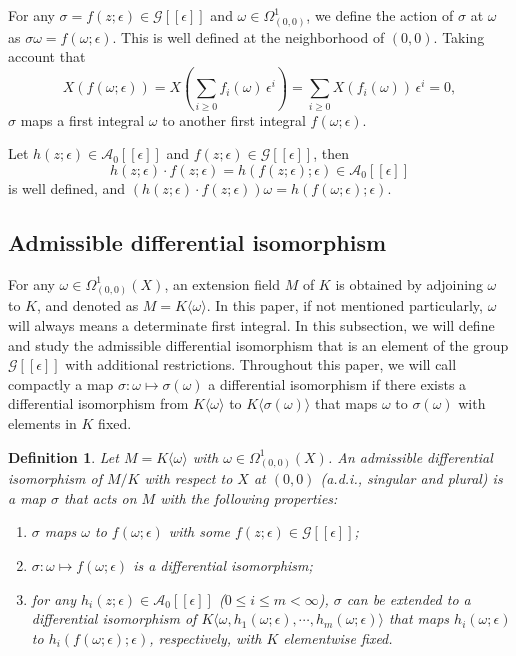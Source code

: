 \documentclass[preprint, 12pt]{elsarticle}
\newtheorem{defn}[thm]{Definition}
\numberwithin{equation}{section}
\newcommand{\A}{\mathcal{A}}
\newcommand{\G}{\mathcal{G}}
\newcommand{\CA}{\G[[\epsilon]]}
\begin{document}
For any $\sigma = f(z;\epsilon)\in \G[[\epsilon]]$ and
$\omega\in\Omega_{(0,0)}^1$, we define the action of $\sigma$
at $\omega$ as $\sigma\omega = f(\omega;\epsilon)$. This is well
defined at the neighborhood of $(0,0)$. Taking account that
$$X(f(\omega;\epsilon)) = X(\sum_{i\geq 0} f_i(\omega)\,\epsilon^i) = \sum_{i\geq 0}X(f_i(\omega))\,\epsilon^i = 0,$$
$\sigma$ maps a first integral $\omega$ to another first integral
$f(\omega;\epsilon)$.

Let $h(z;\epsilon)\in \A_0[[\epsilon]]$ and $f(z;\epsilon)\in
\G[[\epsilon]]$, then
$$h(z;\epsilon)\cdot f(z;\epsilon) = h(f(z;\epsilon);\epsilon)\in\A_0[[\epsilon]]$$
is well defined, and $(h(z;\epsilon)\cdot f(z;\epsilon))\omega =
h(f(\omega;\epsilon);\epsilon)$.

\subsection{Admissible differential isomorphism}
\label{sec:1.2}
For any $\omega\in\Omega_{(0,0)}^1(X)$, an extension field $M$ of
$K$ is obtained by adjoining $\omega$ to $K$, and denoted as $M =
K\langle\omega\rangle$. In this paper, if not mentioned
particularly, $\omega$ will always means a determinate first integral.
In this subsection, we will define and study the admissible
differential isomorphism that is an element of the group $\CA$
with additional restrictions. Throughout this paper, we will call
compactly a map $\sigma:\omega\mapsto\sigma(\omega)$ a
differential isomorphism if there exists a differential
isomorphism from $K\langle\omega\rangle$ to
$K\langle\sigma(\omega)\rangle$ that maps $\omega$ to
$\sigma(\omega)$ with elements in $K$ fixed.

\begin{defn}
\label{def:4}Let $M = K\langle \omega \rangle$ with $\omega\in
\Omega_{(0,0)}^1(X)$. An \textit{admissible differential
isomorphism of $M/K$ with respect to $X$ at $(0,0)$} (a.d.i., singular and plural) is a map $\sigma$ that acts on $M$ with the
following properties: 
\begin{enumerate} 
\item $\sigma$ maps $\omega$ to $f(\omega;\epsilon)$ with some $f(z;\epsilon)\in \CA$;
\item $\sigma: \omega\mapsto f(\omega;\epsilon)$ is a differential
isomorphism;
\item for any $h_i(z;\epsilon)\in \A_0[[\epsilon]]$
($0\leq i \leq m < \infty$), $\sigma$ can be extended to a
differential isomorphism of $K\langle \omega,
h_1(\omega;\epsilon), \cdots, h_m(\omega;\epsilon)\rangle$ that
maps $h_i(\omega;\epsilon)$ to $h_i(f(\omega;\epsilon);\epsilon)$, respectively, with $K$ elementwise fixed.
\end{enumerate} 
\end{defn}
\end{document}
